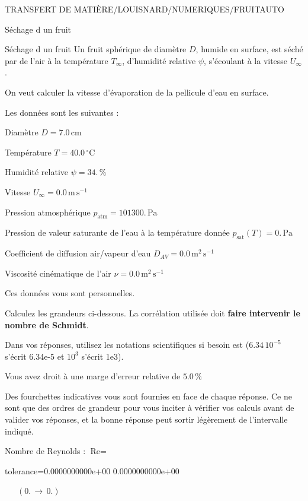 \documentclass[12pt]{article}
\begin{document}
\begin{quiz}{TRANSFERT DE MATIÈRE/LOUISNARD/NUMERIQUES/FRUITAUTO}
\begin{cloze}{Séchage d un fruit}
\end{cloze} 


 \begin{cloze}{Séchage d un fruit} 
Un fruit sphérique de diamètre $D$, humide en surface, est séché par de l'air à la température $T_\infty$, d'humidité relative $\psi$, s'écoulant à la vitesse $U_\infty$.

On veut calculer la vitesse d'évaporation de la pellicule d'eau en surface.

 

Les données sont les suivantes :

 

Diamètre $D = 7.0\,  \mathrm{cm} $

Température $T = 40.0\,  \mathrm{^\circ\mathrm{C}} $

Humidité relative $\psi = 34.\, \% $

Vitesse $U_\infty = 0.0\,  \mathrm{m}\,  \mathrm{s}^{-1} $

Pression atmosphérique $p_{\text{atm}} = 101300.\,  \mathrm{Pa} $

Pression de valeur saturante de l’eau à la température donnée $p_{\text{sat}}(T) = 0.\,  \mathrm{Pa} $

Coefficient de diffusion air/vapeur d’eau $D_{AV} = 0.0\,  \mathrm{m}^{2}\,  \mathrm{s}^{-1} $

Viscosité cinématique de l’air $\nu = 0.0\,  \mathrm{m}^{2}\,  \mathrm{s}^{-1} $

Ces données vous sont personnelles.

 

Calculez les grandeurs ci-dessous. La corrélation utilisée doit \textbf{faire intervenir le nombre de Schmidt}.

Dans vos réponses, utilisez les notations scientifiques si besoin est ($6.34\, 10^{-5}$ s'écrit 6.34e-5 et $10^{3}$ s'écrit 1e3).

Vous avez droit à une marge d'erreur relative de $5.0\, \% $

Des fourchettes indicatives vous sont fournies en face de chaque réponse. Ce ne sont que des ordres de grandeur pour vous inciter à vérifier vos calculs avant de valider vos réponses, et la bonne réponse peut sortir légèrement de l'intervalle indiqué.

 

Nombre de Reynolds : $\text{Re} =  $
\begin{numerical}[points=1] 
\item[tolerance={0.0000000000e+00}] 0.0000000000e+00 
\end{numerical} 
 $\,$ 
 $ \quad (0. \, \rightarrow \, 0.) $ 


\end{cloze}
\end{quiz}
\end{document}
